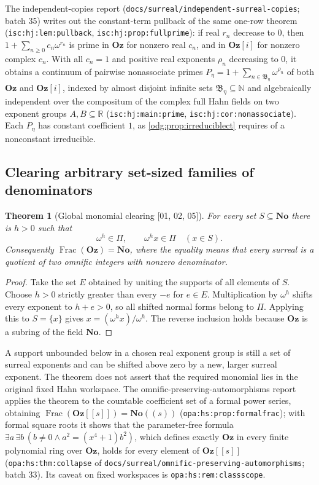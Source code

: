 \documentclass[11pt,oneside]{article}
\numberwithin{equation}{section}
\newtheorem{theorem}{Theorem}[section]
\theoremstyle{definition}
\theoremstyle{remark}
\newcommand{\No}{\mathbf{No}}
\newcommand{\Oz}{\mathbf{Oz}}
\newcommand{\R}{\mathbb R}
\newcommand{\N}{\mathbb N}
\newcommand{\Frac}{\operatorname{Frac}}
\newcommand{\src}[1]{\textup{\textsf{\small[#1]}}}
\newcommand{\replabel}[1]{\nolinkurl{#1}}
\newcommand{\fn}[1]{\nolinkurl{#1}}
\newcommand{\Og}{\Oz[i]}
\begin{document}
The independent-copies report (\fn{docs/surreal/independent-surreal-copies};
batch 35) writes out the constant-term pullback of the same one-row theorem
(\replabel{isc:hj:lem:pullback}, \replabel{isc:hj:prop:fullprime}): if real
$r_n$ decrease to $0$, then $1+\sum_{n\ge0}c_n\omega^{r_n}$ is prime in $\Oz$
for nonzero real $c_n$, and in $\Og$ for nonzero complex $c_n$. With all
$c_n=1$ and positive real exponents $\rho_n$ decreasing to $0$, it obtains a
continuum of pairwise nonassociate primes
$P_\eta=1+\sum_{n\in\mathfrak B_\eta}\omega^{\rho_n}$ of both $\Oz$ and $\Og$,
indexed by almost disjoint infinite sets $\mathfrak B_\eta\subseteq\N$ and
algebraically independent over the compositum of the complex full Hahn fields
on two exponent groups $A,B\subseteq\R$ (\replabel{isc:hj:main:prime},
\replabel{isc:hj:cor:nonassociate}). Each $P_\eta$ has constant coefficient
$1$, as \cref{odg:prop:irreduciblect} requires of a nonconstant irreducible.

\subsection{Clearing arbitrary set-sized families of denominators}

\begin{theorem}[Global monomial clearing \src{01, 02, 05}]\label{odg:thm:fractions}
For every set $S\subseteq\No$ there is $h>0$ such that
\[
 \omega^h\in\Pi,\qquad \omega^h x\in\Pi\quad(x\in S).
\]
Consequently $\Frac(\Oz)=\No$, where the equality means that every surreal
is a quotient of two omnific integers with nonzero denominator.
\end{theorem}
\begin{proof}
Take the set $E$ obtained by uniting the supports of all elements of $S$.
Choose $h>0$ strictly greater than every $-e$ for $e\in E$.
Multiplication by $\omega^h$ shifts every exponent to $h+e>0$, so all
shifted normal forms belong to $\Pi$. Applying this to $S=\{x\}$
gives $x=(\omega^h x)/\omega^h$. The reverse inclusion holds because $\Oz$
is a subring of the field $\No$.
\end{proof}

A support unbounded below in a chosen real exponent group is still a set of
surreal exponents and can be shifted above zero by a new, larger surreal
exponent. The theorem does not assert that the required monomial lies in the
original fixed Hahn workspace.
The omnific-preserving-automorphisms report applies the theorem to the
countable coefficient set of a formal power series, obtaining
$\Frac(\Oz[[s]])=\No((s))$ (\replabel{opa:hs:prop:formalfrac}); with formal
square roots it shows that the parameter-free formula
$\exists a\,\exists b\,(b\ne0\wedge a^2=(x^4+1)b^2)$, which defines exactly
$\Oz$ in every finite polynomial ring over $\Oz$, holds for every element of
$\Oz[[s]]$ (\replabel{opa:hs:thm:collapse} of
\fn{docs/surreal/omnific-preserving-automorphisms}; batch 33). Its caveat on
fixed workspaces is \replabel{opa:hs:rem:classscope}.
\end{document}
